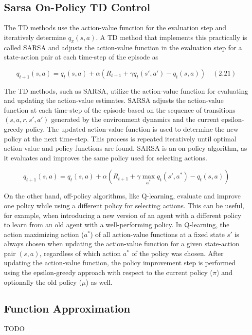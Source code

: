 \documentclass[../xlapes02]{subfiles}
\begin{document}
    \subsection{Sarsa On-Policy TD Control}\label{subsec:sarsa-on-policy-td-control}
    The TD methods use the action-value function for the evaluation step and iteratively determine $q_\pi(s,a)$. A TD method that implements this practically is called SARSA and adjusts the action-value function in the evaluation step for a state-action pair at each time-step of the episode as

    \[
        q_{t+1}(s, a) = q_t(s, a) + \alpha \left( R_{t+1} + \gamma q_t(s', a') - q_t(s, a) \right) \quad (2.21)
    \]

    The TD methods, such as SARSA, utilize the action-value function for evaluating and updating the action-value estimates. SARSA adjusts the action-value function at each time-step of the episode based on the sequence of transitions \( (s, a, r, s', a') \) generated by the environment dynamics and the current epsilon-greedy policy. The updated action-value function is used to determine the new policy at the next time-step. This process is repeated iteratively until optimal action-value and policy functions are found. SARSA is an on-policy algorithm, as it evaluates and improves the same policy used for selecting actions.

    \[
        q_{t+1}(s, a) = q_t(s, a) + \alpha \left( R_{t+1} + \gamma \max_{a^*} q_t(s', a^*) - q_t(s, a) \right)
    \]

    On the other hand, off-policy algorithms, like Q-learning, evaluate and improve one policy while using a different policy for selecting actions. This can be useful, for example, when introducing a new version of an agent with a different policy to learn from an old agent with a well-performing policy. In Q-learning, the action maximizing action (\( a^* \)) of all action-value functions at a fixed state \( s' \) is always chosen when updating the action-value function for a given state-action pair \( (s, a) \), regardless of which action \( a^* \) of the policy was chosen. After updating the action-value function, the policy improvement step is performed using the epsilon-greedy approach with respect to the current policy (\( \pi \)) and optionally the old policy (\( \mu \)) as well.

    \subsection{Function Approximation}\label{subsec:function-approximation}
    TODO
\end{document}
